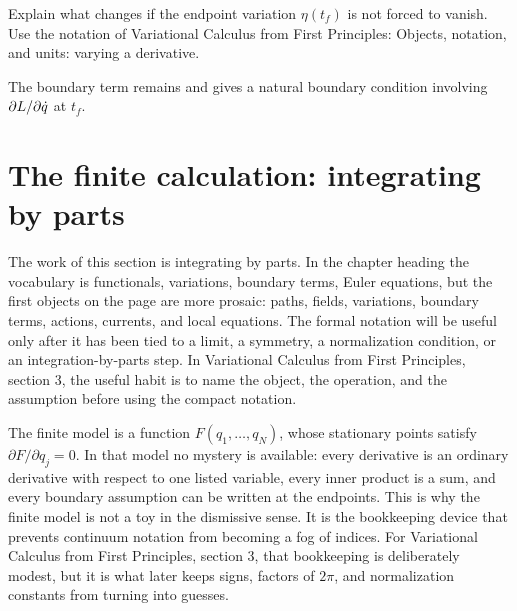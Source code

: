 \begin{exercise}
Explain what changes if the endpoint variation \(\eta(t_f)\) is not forced to vanish.  Use the notation of Variational Calculus from First Principles: Objects, notation, and units: varying a derivative.
\begin{answer}
The boundary term remains and gives a natural boundary condition involving \(\partial L/\partial\dot q\) at \(t_f\).
\end{answer}
\end{exercise}



\section{The finite calculation: integrating by parts}













The work of this section is integrating by parts.  In the chapter heading the vocabulary is functionals, variations, boundary terms, Euler equations, but the first objects on the page are more prosaic: paths, fields, variations, boundary terms, actions, currents, and local equations.  The formal notation will be useful only after it has been tied to a limit, a symmetry, a normalization condition, or an integration-by-parts step.  In Variational Calculus from First Principles, section 3, the useful habit is to name the object, the operation, and the assumption before using the compact notation.

The finite model is a function \(F(q_1,\ldots,q_N)\), whose stationary points satisfy \( \partial F/\partial q_j=0 \).  In that model no mystery is available: every derivative is an ordinary derivative with respect to one listed variable, every inner product is a sum, and every boundary assumption can be written at the endpoints.  This is why the finite model is not a toy in the dismissive sense.  It is the bookkeeping device that prevents continuum notation from becoming a fog of indices.  For Variational Calculus from First Principles, section 3, that bookkeeping is deliberately modest, but it is what later keeps signs, factors of \(2\pi\), and normalization constants from turning into guesses.

